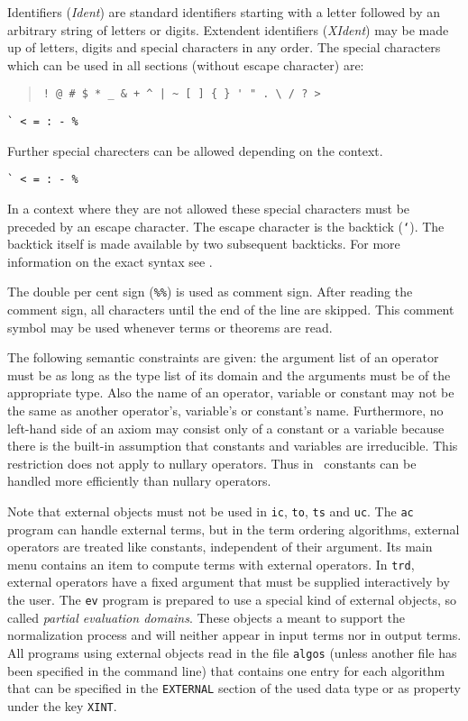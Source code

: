 Identifiers ({\it Ident}) are standard identifiers starting with a letter
followed by an arbitrary string of letters or digits.
Extendent identifiers ({\it XIdent}) may be made up of letters, digits
and special characters in any order.
The special characters which can be used in all sections (without escape
character) are:
\begin{quote} 
{\tt\verb:! @ # $ * _ & + ^ | ~ [ ] { } ' " . \ / ? >:}
\end{quote}
\begin{verbatim} 
` < = : - % 
\end{verbatim}
Further special charecters can be allowed depending on the context.
\begin{verbatim} 
` < = : - % 
\end{verbatim}
In a context where they are not allowed these special characters must be 
preceded by an escape character.
The escape character is the backtick ({\tt `}). 
The backtick itself is made available by two subsequent backticks.
For more information on the exact syntax see \NPUG.

The double per cent sign (\verb/%%/) is used as comment sign.  After
reading the comment sign, all characters until the end of the line are
skipped.  This comment symbol may be used whenever terms or theorems
are read.

The following semantic constraints are given: the argument list of an
operator must be as long as the type list of its domain and the
arguments must be of the appropriate type. Also the name of an
operator, variable or constant may not be the same as another
operator's, variable's or constant's name.  Furthermore, no left-hand
side of an axiom may consist only of a constant or a variable because
there is the built-in assumption that constants and variables are
irreducible.
This restriction does not apply to nullary operators.  Thus
in \redux\  constants can be handled more efficiently than nullary operators.

Note that external objects must not be used in {\tt ic}, {\tt to}, {\tt ts}
and {\tt uc}.
The {\tt ac} program can handle external terms, but in the term ordering
algorithms, external operators
are treated like constants, independent of their argument. Its
main menu contains an item to compute terms with external operators.
In {\tt trd}, external operators have a fixed argument that
must be supplied interactively by the user.
The {\tt ev} program is prepared to use a special kind of external objects,
so called {\em partial evaluation domains}.
These objects a meant to support the normalization process and will neither
appear in input terms nor in output terms.
All programs using external objects read in the file {\tt algos}
(unless another file has been specified in the command line)
that contains one entry for each algorithm that can be specified
in the {\tt EXTERNAL} section of the used data type or as property under
the key {\tt XINT}.

